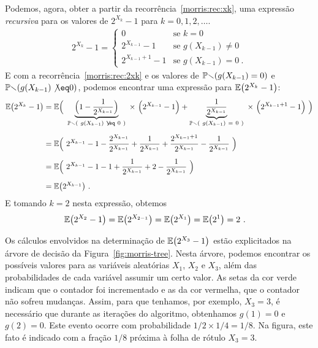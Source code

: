 Podemos, agora, obter a partir da recorrência~\eqref{morris:rec:xk}, uma expressão \textit{recursiva} para os valores de 
$2^{X_k} - 1$ para $k = 0,1,2,\dots$.
\begin{align}
  \label{morris:rec:2xk}
  2^{X_k}-1 = \begin{cases} 
  0                     & \mbox{se } k = 0 \\[2mm]
  2^{X_{k-1}} - 1       & \mbox{se } g(X_{k-1}) \neq 0 \\[2mm]
  2^{X_{k-1} + 1} - 1   & \mbox{se } g(X_{k-1}) =  0\ .  
\end{cases}
\end{align}
E com a recorrência~\eqref{morris:rec:2xk} e os valores de $\mathbb{Pr}(g(X_{k-1}) = 0)$ e $\Pbb(g(X_{k-1}) \not\eq 0)$, 
podemos encontrar uma expressão para $\mathbb{E}\big(2^{X_k} - 1\big)$:
\begin{align}
  \label{morris:rec:e}
  \Ebb\big(2^{X_k} - 1\big)
  &= \Ebb \Big( \ \underbrace{\Big(1 - \frac{1}{2^{X_{k-1}}}\Big)}_{\Pbb( \ g(X_{k-1}) \ \not\eq \ 0 \ )} \ \times \
  \Big( 2^{X_{k-1}}-1 \Big) + \underbrace{\frac{1}{2^{X_{k-1}}}}_{\Pbb( \ g(X_{k-1}) \ = \ 0 \ )} \ \times \
  \Big(2^{X_{k-1} + 1} - 1 \Big) \ \Big) \nonumber \\[2mm]
  &= \Ebb\Big(\ 2^{X_{k-1}} - 1 - \frac{2^{X_{k-1}}}{2^{X_{k-1}}} + \frac{1}{2^{X_{k-1}}}  + 
  \frac{2^{X_{k-1} + 1}}{2^{X_{k-1}}}  - \frac{1}{2^{X_{k-1}}} \ \Big) \nonumber \\[2mm]
  & = \Ebb\Big(\ 2^{X_{k-1}} - 1 - 1 + \frac{1}{2^{X_{k-1}}}  + 2  - \frac{1}{2^{X_{k-1}}} \ \Big) \nonumber \\[2mm]
  & = \Ebb\big( 2^{X_{k-1}}  \big) \ .
\end{align}
E tomando $k = 2$ nesta expressão, obtemos
\begin{align*}
  \mathbb{E}\big(2^{X_2}-1\big) & =  \mathbb{E}\big(2^{X_{2-1}}\big) = \mathbb{E}\big(2^{X_{1}}\big) = \mathbb{E}\big(2^{{1}}\big) = 2 \ . 
\end{align*}

Os cálculos envolvidos na determinação de $\mathbb{E}\big(2^{X_3} - 1\big)$ estão explicitados na árvore de decisão da 
Figura~\ref{fig:morris-tree}. Nesta árvore, podemos encontrar os possíveis valores para as variáveis aleatórias $X_1$, 
$X_2$ e $X_3$, além das probabilidades de cada variável assumir um certo valor. As setas da cor verde indicam que o 
contador foi incrementado e as da cor vermelha, que o contador não sofreu mudanças. Assim, para que tenhamos, por 
exemplo, $X_3 = 3$, é necessário que durante as iterações do algoritmo, obtenhamos $g(1) = 0$ e $g(2) = 0$. Este evento 
ocorre com probabilidade $1/2 \times 1/4 = 1/8$. Na figura, este fato é indicado com a fração $1/8$ próxima à folha de 
rótulo $X_3 = 3$.

